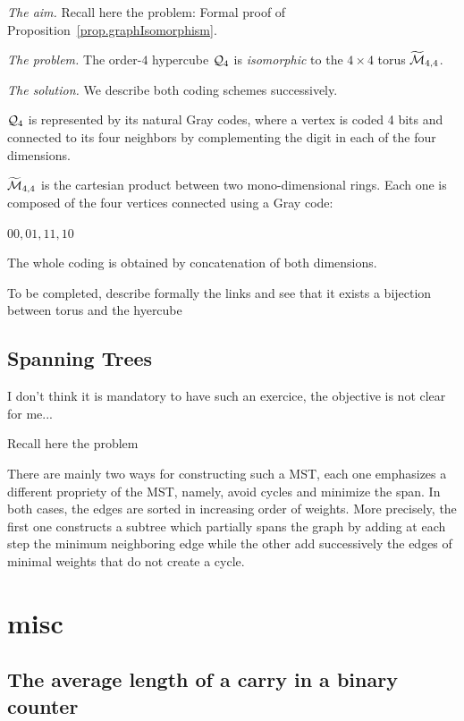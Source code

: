 \noindent \textit{The aim.}
Recall here the problem:
Formal proof of Proposition~\ref{prop.graphIsomorphism}. 
\medskip

\noindent \textit{The problem.}
The order-$4$ hypercube $\mbox{$\cal Q$}_4$ is \textit{isomorphic} to the $4 \times
4$ torus $\widetilde{\mbox{$\cal M$}}_{4,4}$.
\medskip

\noindent \textit{The solution.}
We describe both coding schemes successively. 

$\mbox{$\cal Q$}_4$ is represented by its natural Gray codes,
where a vertex is coded 4 bits and connected to its four neighbors by complementing 
the digit in each of the four dimensions.
\medskip

$\widetilde{\mbox{$\cal M$}}_{4,4}$ is the cartesian product between two mono-dimensional rings.
Each one is composed of the four vertices connected using a Gray code:

$00, 01, 11, 10$

The whole coding is obtained by concatenation of both dimensions.
\medskip

{\Denis To be completed, describe formally the links and see that it exists a bijection between torus and the hyercube}

\subsection{Spanning Trees}
\label{Exercice:spanningTrees}

{\Denis I don't think it is mandatory to have such an exercice, the objective is not clear for me...}

Recall here the problem
\medskip

There are mainly two ways for constructing such a MST, each one
emphasizes a different propriety of the MST, namely, avoid cycles and
minimize the span.  In both cases, the edges are sorted in increasing
order of weights.  More precisely, the first one constructs a subtree
which partially spans the graph by adding at each step the minimum
neighboring edge while the other add successively the edges of minimal
weights that do not create a cycle.





\section{misc}

\subsection{The average length of a carry in a binary counter}

